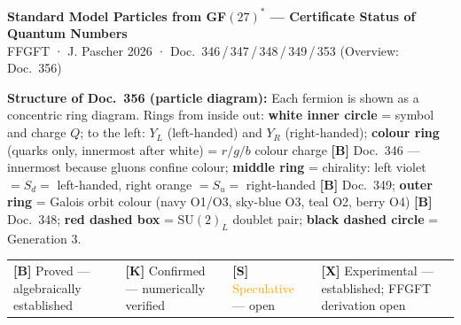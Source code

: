 \documentclass[10pt,a4paper,landscape]{article}
\begin{document}
\begin{center}
{\Large\bfseries Standard Model Particles from GF$(27)^*$ — Certificate Status of Quantum Numbers}\\[1mm]
{\normalsize FFGFT · J. Pascher 2026 · Doc.~346\,/\,347\,/\,348\,/\,349\,/\,353
\quad (Overview: Doc.~356)}
\end{center}

\vspace{2mm}

\noindent\textbf{Structure of Doc.~356 (particle diagram):}
Each fermion is shown as a concentric ring diagram. Rings from inside out:
\textbf{white inner circle} = symbol and charge $Q$; to the left: $Y_L$ (left-handed) and $Y_R$ (right-handed);
\textbf{colour ring} (quarks only, innermost after white) = $r/g/b$ colour charge \textbf{[B]} Doc.~346 — innermost because gluons confine colour;
\textbf{middle ring} = chirality: left violet $= S_d =$ left-handed, right orange $= S_u =$ right-handed \textbf{[B]} Doc.~349;
\textbf{outer ring} = Galois orbit colour (navy O1/O3, sky-blue O3, teal O2, berry O4) \textbf{[B]} Doc.~348;
\textbf{red dashed box} = SU$(2)_L$ doublet pair;
\textbf{black dashed circle} = Generation 3.

\vspace{2mm}

\begin{center}
\begin{tabular}{@{}llll@{}}
\textbf{[B]} \textcolor{gruen}{Proved} — algebraically established \quad &
\textbf{[K]} \textcolor{blau}{Confirmed} — numerically verified \quad &
\textbf{[S]} \textcolor{orange}{Speculative} — open \quad &
\textbf{[X]} \textcolor{rot}{Experimental} — established; FFGFT derivation open
\end{tabular}
\end{center}

\vspace{2mm}
\end{document}
